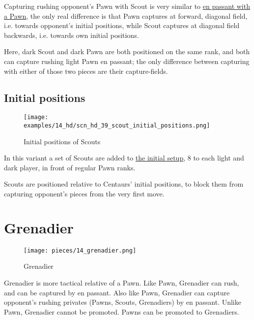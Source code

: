 Capturing rushing opponent's Pawn with Scout is very similar to
\href{https://en.wikipedia.org/wiki/En_passant}{en passant with a Pawn},
the only real difference is that Pawn captures at forward, diagonal field,
i.e. towards opponent's initial positions, while Scout captures at diagonal
field backwards, i.e. towards own initial positions.

Here, dark Scout and dark Pawn are both positioned on the same rank, and both
can capture rushing light Pawn en passant; the only difference between capturing
with either of those two pieces are their capture-fields.

\clearpage %

\subsection*{Initial positions}
\label{sec:Hemera's Dawn/Scout/Initial positions}

\vspace*{-1.2\baselineskip}
\noindent
\begin{figure}[!h]
\texttt{[image: examples/14\_hd/scn\_hd\_39\_scout\_initial\_positions.png]}
\vspace*{-1.3\baselineskip}
\caption{Initial positions of Scouts}
\label{fig:scn_hd_39_scout_initial_positions}
\end{figure}

\vspace*{-0.5\baselineskip}
In this variant a set of Scouts are added to
\hyperref[fig:14_hemera_s_dawn]{the initial setup}, 8 to each light and dark
player, in front of regular Pawn ranks.

Scouts are positioned relative to Centaurs' initial positions, to block them
from capturing opponent's pieces from the very first move.

\clearpage %

\section*{Grenadier}
\label{sec:Hemera's Dawn/Grenadier}

\vspace*{-0.7\baselineskip}
\noindent
\begin{wrapfigure}[10]{l}{0.4\textwidth}
\centering
\texttt{[image: pieces/14\_grenadier.png]}
\vspace*{-1.3\baselineskip}
\caption{Grenadier}
\label{fig:14_grenadier}
\end{wrapfigure}
Grenadier is more tactical relative of a Pawn. Like Pawn, Grenadier can rush, and
can be captured by en passant. Also like Pawn, Grenadier can capture opponent's
rushing privates (Pawns, Scouts, Grenadiers) by en passant. Unlike Pawn, Grenadier
cannot be promoted. Pawns can be promoted to Grenadiers.

